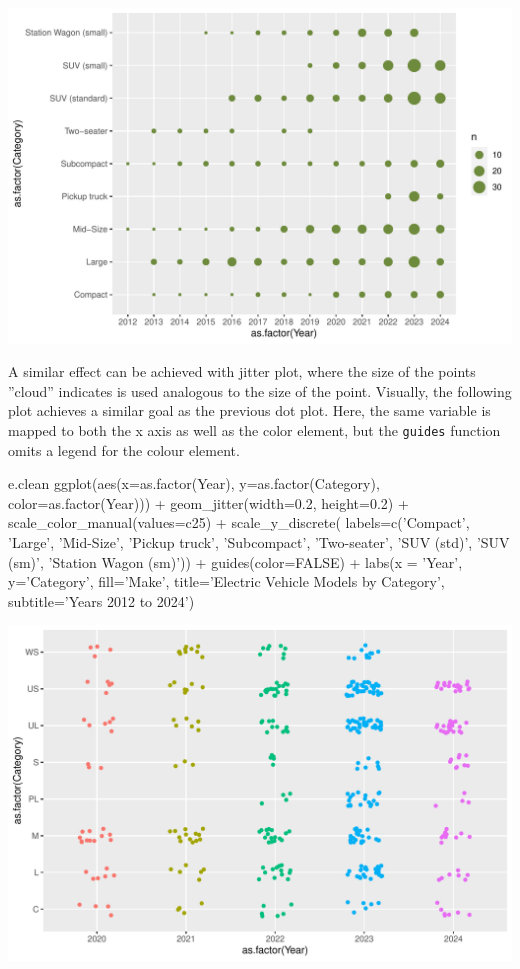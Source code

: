 \begin{center}
  \includegraphics[width=.8\textwidth]{fuel.count.pdf}
\end{center}

A similar effect can be achieved with jitter plot, where the size of the points ''cloud'' indicates is used analogous to the size of the point. Visually, the following plot achieves a similar goal as the previous dot plot. Here, the same variable is mapped to both the x axis as well as the color element, but the \texttt{guides} function omits a legend for the colour element.

\begin{samepage}
\begin{Rcode}
e.clean %
  ggplot(aes(x=as.factor(Year), 
             y=as.factor(Category), 
             color=as.factor(Year))) +
    geom_jitter(width=0.2, height=0.2) +
    scale_color_manual(values=c25) +
    scale_y_discrete(
      labels=c('Compact', 'Large', 'Mid-Size', 
               'Pickup truck', 'Subcompact',
               'Two-seater', 'SUV (std)', 
               'SUV (sm)', 'Station Wagon (sm)')) + 
    guides(color=FALSE) +
    labs(x = 'Year', 
         y='Category', 
         fill='Make', 
         title='Electric Vehicle Models by Category', 
         subtitle='Years 2012 to 2024')
\end{Rcode}
\end{samepage}

\begin{center}
  \includegraphics[width=.8\textwidth]{fuel.jitterdiscrete.pdf}
\end{center}

